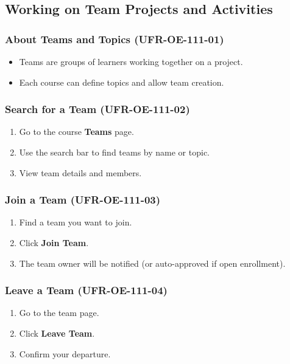 \subsection{Working on Team Projects and Activities}

\subsubsection{About Teams and Topics (UFR-OE-111-01)}
\begin{itemize}
    \item Teams are groups of learners working together on a project.
    \item Each course can define topics and allow team creation.
\end{itemize}

\subsubsection{Search for a Team (UFR-OE-111-02)}
\begin{enumerate}
    \item Go to the course \textbf{Teams} page.
    \item Use the search bar to find teams by name or topic.
    \item View team details and members.
\end{enumerate}

\subsubsection{Join a Team (UFR-OE-111-03)}
\begin{enumerate}
    \item Find a team you want to join.
    \item Click \textbf{Join Team}.
    \item The team owner will be notified (or auto-approved if open enrollment).
\end{enumerate}

\subsubsection{Leave a Team (UFR-OE-111-04)}
\begin{enumerate}
    \item Go to the team page.
    \item Click \textbf{Leave Team}.
    \item Confirm your departure.
\end{enumerate}

